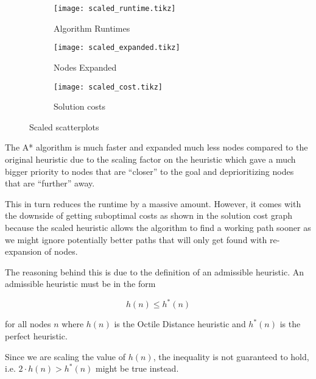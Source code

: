 \documentclass{article}
\begin{document}
\begin{figure}[h]
  \centering
  \begin{subfigure}[c]{0.3\textwidth}
    \texttt{[image: scaled\_runtime.tikz]}
    \caption{Algorithm Runtimes}
  \end{subfigure}
  \begin{subfigure}[c]{0.3\textwidth}
    \texttt{[image: scaled\_expanded.tikz]}
    \caption{Nodes Expanded}
  \end{subfigure}
  \begin{subfigure}[c]{0.3\textwidth}
    \texttt{[image: scaled\_cost.tikz]}
    \caption{Solution costs}
  \end{subfigure}
  \caption{Scaled scatterplots}
\end{figure}
The A* algorithm is much faster and expanded much less nodes compared to the original heuristic due to the scaling factor on the heuristic which gave a much bigger priority to nodes that are ``closer'' to the goal and deprioritizing nodes that are ``further'' away.

This in turn reduces the runtime by a massive amount. However, it comes with the downside of getting suboptimal costs as shown in the solution cost graph because the scaled heuristic allows the algorithm to find a working path sooner as we might ignore potentially better paths that will only get found with re-expansion of nodes.

The reasoning behind this is due to the definition of an admissible heuristic. An admissible heuristic must be in the form

\[
  h\left(n\right) \leq h^{*}\left(n\right)
\]

for all nodes \( n \) where \( h\left(n\right) \) is the Octile Distance heuristic and \( h^{*}\left(n\right) \) is the perfect heuristic.

Since we are scaling the value of \(h\left(n\right)\), the inequality is not guaranteed to hold, i.e. \( 2 \cdot h\left(n\right) > h^{*}\left(n\right)\) might be true instead.
\end{document}
